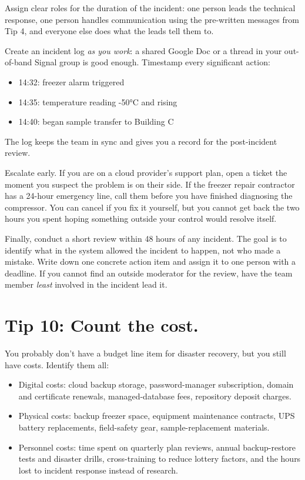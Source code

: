 \documentclass[10pt,letterpaper]{article}
\begin{document}
Assign clear roles for the duration of the incident: one person leads the
technical response, one person handles communication using the pre-written
messages from Tip 4, and everyone else does what the leads tell them to.

Create an incident log \emph{as you work}: a shared Google Doc or a thread in
your out-of-band Signal group is good enough. Timestamp every significant
action:

\begin{itemize}
\item  14:32: freezer alarm triggered
\item 14:35: temperature reading -50°C and rising
\item 14:40: began sample transfer to Building C
\end{itemize}

The log keeps the team in sync and gives you a record for the post-incident
review.

Escalate early. If you are on a cloud provider's support plan, open a ticket the
moment you suspect the problem is on their side. If the freezer repair
contractor has a 24-hour emergency line, call them before you have finished
diagnosing the compressor.  You can cancel if you fix it yourself, but you
cannot get back the two hours you spent hoping something outside your control
would resolve itself.

Finally, conduct a short review within 48 hours of any incident. The goal is to
identify what in the system allowed the incident to happen, not who made a
mistake. Write down one concrete action item and assign it to one person with a
deadline. If you cannot find an outside moderator for the review, have the team
member \emph{least} involved in the incident lead it.

\section*{Tip 10: Count the cost.}

You probably don't have a budget line item for disaster recovery, but you still
have costs. Identify them all:

\begin{itemize}
\item
  Digital costs: cloud backup storage, password-manager subscription, domain and
  certificate renewals, managed-database fees, repository deposit charges.

\item
  Physical costs: backup freezer space, equipment maintenance contracts, UPS
  battery replacements, field-safety gear, sample-replacement materials.

\item
  Personnel costs: time spent on quarterly plan reviews, annual backup-restore
  tests and disaster drills, cross-training to reduce lottery factors, and the
  hours lost to incident response instead of research.
\end{itemize}
\end{document}
